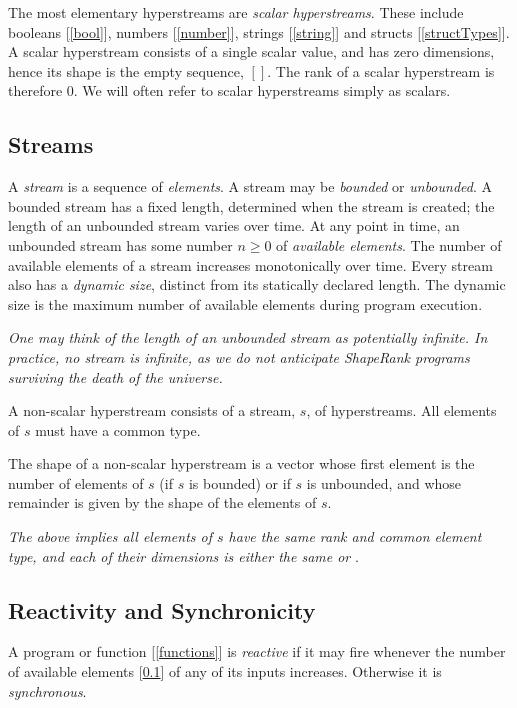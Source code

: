 \documentclass{article}
\begin{document}
The most elementary hyperstreams are {\em scalar hyperstreams}. These include  booleans [\ref{bool}], numbers [\ref{number}], strings [\ref{string}] and  structs [\ref{structTypes}]. A scalar hyperstream consists of a single scalar value, and has zero dimensions, hence its shape is the empty sequence, $[]$. The rank of a scalar hyperstream is therefore $0$. We will often refer to scalar hyperstreams simply as scalars.

\subsection{Streams}
\label{streams}

A {\em stream} is a sequence of {\em elements}.  A stream may be {\em bounded} or {\em unbounded}. A bounded stream has a fixed length, determined when the stream is created; the length of an unbounded stream varies over time. At any point in time, an unbounded stream has some number $n \ge 0$ of {\em available elements}. The number of available elements of a stream increases monotonically over time. Every stream also has a {\em dynamic size}, distinct from its statically declared length. The dynamic size is the maximum number of available elements during program execution.

{\em One may think of the length of an unbounded stream as potentially infinite. In practice, no stream is infinite, as we do not anticipate ShapeRank programs surviving the death of the universe.
}

A non-scalar hyperstream consists of a stream, $s$, of hyperstreams. All elements of $s$ must have a common type.  

The shape of a non-scalar hyperstream is a vector whose first element is the number of elements of $s$ (if $s$ is bounded) or \QUESTIONMARK if $s$ is unbounded, and
whose remainder is given by the shape of the elements of $s$.

{\em The above implies all elements of $s$ have the same rank and common element type, and each of their dimensions is either the same or \QUESTIONMARK}.


\subsection{Reactivity and Synchronicity}
\label{reactivityAndSynchronicity}

A program or function [\ref{functions}] is {\em reactive} if it may fire whenever the number of available elements [\ref{streams}] of any of its inputs increases. Otherwise it is {\em synchronous}.
\end{document}
